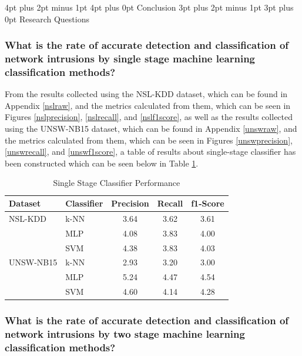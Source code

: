 \documentclass[12pt,a4paper]{article}
\makeatletter
\renewcommand\subsection{\@startsection {subsection}{1}{2mm} %
      {3pt plus 2pt minus 1pt} %
      {3pt plus 0pt} %
      {\normalfont\bfseries}}
\renewcommand\section{\@startsection {section}{1}{0mm} %
      {4pt plus 2pt minus 1pt} %
      {4pt plus 0pt} %
      {\bfseries}}
\makeatother
\begin{document}
\newpage
\section{Conclusion}
\subsection{Research Questions}
\subsubsection*{What is the rate of accurate detection and classification of network intrusions by single stage machine learning classification methods?}

From the results collected using the NSL-KDD dataset, which can be found in Appendix \ref{nslraw}, and the metrics calculated from them, which can be seen in Figures \ref{nslprecision}, \ref{nslrecall}, and \ref{nslf1score}, as well as the results collected using the UNSW-NB15 dataset, which can be found in Appendix \ref{unswraw}, and the metrics calculated from them, which can be seen in Figures \ref{unswprecision}, \ref{unswrecall}, and \ref{unswf1score}, a table of results about single-stage classifier has been constructed which can be seen below in Table \ref{singlestagemetric}.

\begin{table}[H]
\centering
\caption{Single Stage Classifier Performance}
\label{singlestagemetric}
\begin{tabular}{@{}llccc@{}}
\toprule
Dataset & Classifier & Precision & Recall & f1-Score \\ \midrule
NSL-KDD   & k-NN & 3.64     & 3.62  & 3.61    \\
          & MLP  & 4.08     & 3.83  & 4.00    \\
	  & SVM  & 4.38     & 3.83  & 4.03    \\
UNSW-NB15 & k-NN & 2.93     & 3.20  & 3.00    \\
          & MLP  & 5.24     & 4.47  & 4.54    \\ 
	  & SVM  & 4.60     & 4.14  & 4.28    \\ \bottomrule
\end{tabular}
\end{table}


\subsubsection*{What is the rate of accurate detection and classification of network intrusions by two stage machine learning classification methods?}
\end{document}
